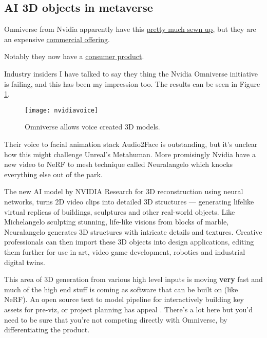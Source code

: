 \subsection{AI 3D objects in metaverse}
Onmiverse from Nvidia apparently have this \href{https://www.nvidia.com/en-us/gpu-cloud/picasso/}{pretty much sewn up}, but they are an expensive \href{https://developer.nvidia.com/blog/rapidly-generate-3d-assets-for-virtual-worlds-with-generative-ai/}{commercial offering}. \par
Notably they now have a \href{https://blogs.nvidia.com/blog/2023/06/27/magiscan-app-augmented-reality-openusd/?}{consumer product}. \par
Industry insiders I have talked to say they thing the Nvidia Omniverse initiative is failing, and this has been my impression too. The results can be seen in Figure \ref{fig:nvidiavoice}.
\begin{figure}[H]
    \centering
    \texttt{[image: nvidiavoice]}
    \caption{Omniverse allows voice created 3D models.}
    \label{fig:nvidiavoice}
\end{figure}
Their voice to facial animation stack Audio2Face is outstanding, but it's unclear how this might challenge Unreal's Metahuman. More promisingly Nvidia have a new video to NeRF to mesh technique called Neuralangelo \cite{li2023neuralangelo} which knocks everything else out of the park. 
\begin{tcolorbox}[enhanced, frame style={fill=lightgray}, interior style={fill=lightgray}]The new AI model by NVIDIA Research for 3D reconstruction using neural networks, turns 2D video clips into detailed 3D structures — generating lifelike virtual replicas of buildings, sculptures and other real-world objects. Like Michelangelo sculpting stunning, life-like visions from blocks of marble, Neuralangelo generates 3D structures with intricate details and textures. Creative professionals can then import these 3D objects into design applications, editing them further for use in art, video game development, robotics and industrial digital twins.
\end{tcolorbox}
This area of 3D generation from various high level inputs is moving \textbf{very} fast and much of the high end stuff is coming as software that can be built on (like NeRF). An open source text to model pipeline for interactively building key assets for pre-viz, or project planning has appeal  \cite{poole2022dreamfusion}.
There's a lot here but you'd need to be sure that you're not competing directly with Omniverse, by differentiating the product.

